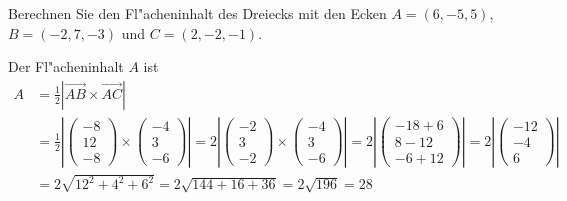 Berechnen Sie den Fl"acheninhalt des Dreiecks mit den Ecken $A=(6,-5,5)$,
$B=(-2,7,-3)$ und $C=(2,-2,-1)$.

\begin{loesung}
Der Fl"acheninhalt $A$ ist
\begin{align*}
A&=\frac12|\overrightarrow{AB}\times\overrightarrow{AC}|\\
&=
\frac12\left|
\begin{pmatrix}-8\\12\\-8\end{pmatrix}
\times
\begin{pmatrix}-4\\3\\-6\end{pmatrix}
\right|
=
2\left|
\begin{pmatrix}-2\\3\\-2\end{pmatrix}
\times
\begin{pmatrix}-4\\3\\-6\end{pmatrix}
\right|
=
2\left|
\begin{pmatrix}
-18+6\\8-12\\-6+12
\end{pmatrix}
\right|
=
2\left|
\begin{pmatrix}
-12\\-4\\6
\end{pmatrix}
\right|
\\
&=
2\sqrt{12^2+4^2+6^2}
=
2\sqrt{144+16+36}=2\sqrt{196}=28
\end{align*}

\end{loesung}


